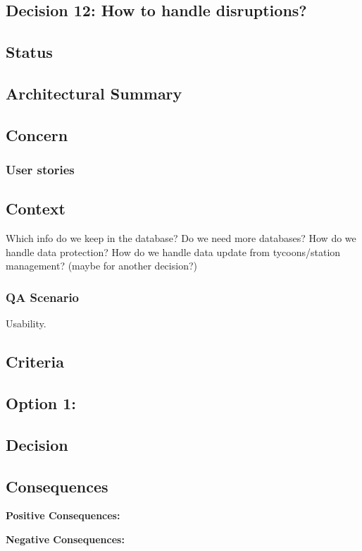 \subsection{Decision 12: How to handle disruptions?}

\subsection*{Status}

\subsection*{Architectural Summary}


\subsection*{Concern}
\subsubsection*{User stories}

\subsection*{Context}
Which info do we keep in the database? 
Do we need more databases?
How do we handle data protection?
How do we handle data update from tycoons/station management? (maybe for another decision?)

\subsubsection*{QA Scenario} %
Usability.
\subsection*{Criteria}
\begin{itemize}
\end{itemize}

\subsection*{Option 1: }

\subsection*{Decision}

\subsection*{Consequences}
\textbf{Positive Consequences:}
\begin{itemize}
\end{itemize}
\textbf{Negative Consequences:}
\begin{itemize}
\end{itemize}